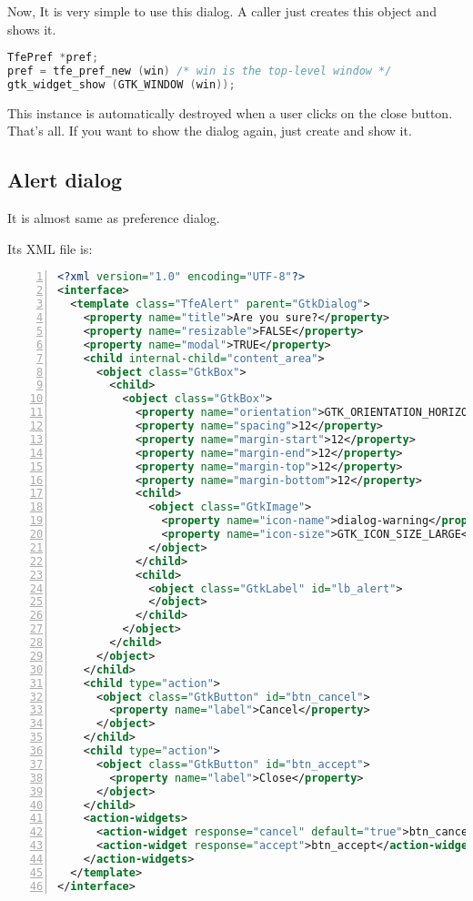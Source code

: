 Now, It is very simple to use this dialog. A caller just creates this
object and shows it.

\begin{lstlisting}[language=C]
TfePref *pref;
pref = tfe_pref_new (win) /* win is the top-level window */
gtk_widget_show (GTK_WINDOW (win));
\end{lstlisting}

This instance is automatically destroyed when a user clicks on the close
button. That's all. If you want to show the dialog again, just create
and show it.

\hypertarget{alert-dialog}{%
\subsection{Alert dialog}\label{alert-dialog}}

It is almost same as preference dialog.

Its XML file is:

\begin{lstlisting}[language=XML, numbers=left]
<?xml version="1.0" encoding="UTF-8"?>
<interface>
  <template class="TfeAlert" parent="GtkDialog">
    <property name="title">Are you sure?</property>
    <property name="resizable">FALSE</property>
    <property name="modal">TRUE</property>
    <child internal-child="content_area">
      <object class="GtkBox">
        <child>
          <object class="GtkBox">
            <property name="orientation">GTK_ORIENTATION_HORIZONTAL</property>
            <property name="spacing">12</property>
            <property name="margin-start">12</property>
            <property name="margin-end">12</property>
            <property name="margin-top">12</property>
            <property name="margin-bottom">12</property>
            <child>
              <object class="GtkImage">
                <property name="icon-name">dialog-warning</property>
                <property name="icon-size">GTK_ICON_SIZE_LARGE</property>
              </object>
            </child>
            <child>
              <object class="GtkLabel" id="lb_alert">
              </object>
            </child>
          </object>
        </child>
      </object>
    </child>
    <child type="action">
      <object class="GtkButton" id="btn_cancel">
        <property name="label">Cancel</property>
      </object>
    </child>
    <child type="action">
      <object class="GtkButton" id="btn_accept">
        <property name="label">Close</property>
      </object>
    </child>
    <action-widgets>
      <action-widget response="cancel" default="true">btn_cancel</action-widget>
      <action-widget response="accept">btn_accept</action-widget>
    </action-widgets>
  </template>
</interface>
\end{lstlisting}

